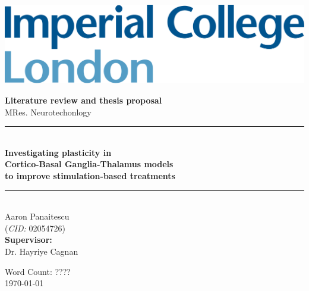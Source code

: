 

\newcommand{\ballarrow}{\tikz[baseline=-0.6ex]{\draw[->] (0,0) -- (0.5,0); \filldraw (0.5,0) circle (2pt);}}


\begin{titlepage}
	\newcommand{\HRule}{\rule{\linewidth}{0.5mm}}
	\setlength{\topmargin}{0in}
	\center

	\begin{flushleft} \large
		\begin{minipage}{0.4\textwidth}
			\includegraphics[scale=0.14]{imperial.png}
		\end{minipage}
	\end{flushleft}
	\vspace{4cm}

	\textbf{\large Literature review and thesis proposal}\\[0.1cm]
	{\large MRes. Neurotechonlogy}\\[0.5cm]

	\HRule \\[0.4cm]
	{\Large \bfseries Investigating plasticity in \\ Cortico-Basal Ganglia-Thalamus models \\ to improve stimulation-based treatments }
	\HRule \\[1cm]


	{\large Aaron Panaitescu \\
	(\textit{CID:} 02054726) \\[0.4cm]
	\textbf{Supervisor:} \\
	Dr. Hayriye Cagnan}


	\vfill
	{Word Count: ????}\\[0.4cm]
	{\large \today}\\[0.8cm]
\end{titlepage}
